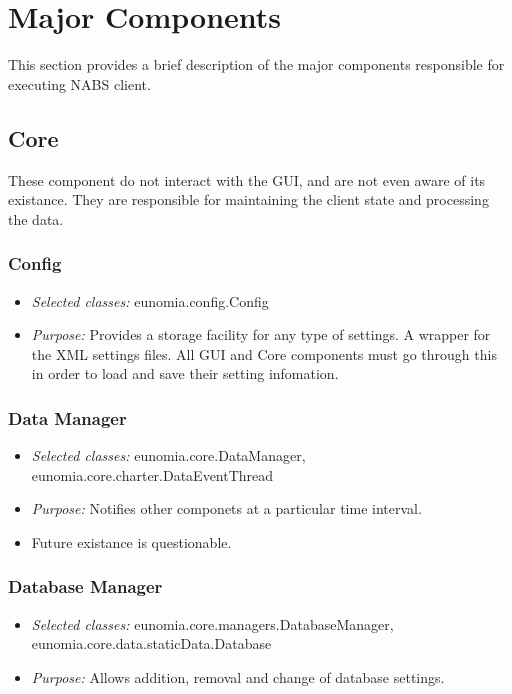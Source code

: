 \documentclass[titlepage,12pt]{article}
\begin{document}
\section{Major Components}
This section provides a brief description of the major components responsible for executing NABS client.

\subsection{Core}
These component do not interact with the GUI, and are not even aware of its existance. They are responsible for maintaining the client state and processing the data.

\subsubsection{Config}
\begin{itemize}
\item \emph{Selected classes:} eunomia.config.Config
\item \emph{Purpose:} Provides a storage facility for any type of settings. A wrapper for the XML settings files. All GUI and Core components must go through this in order to load and save their setting infomation.
\end{itemize}

\subsubsection{Data Manager}
\begin{itemize}
\item \emph{Selected classes:} eunomia.core.DataManager, eunomia.core.charter.DataEventThread
\item \emph{Purpose:} Notifies other componets at a particular time interval.
\item Future existance is questionable.
\end{itemize}

\subsubsection{Database Manager}
\begin{itemize}
\item \emph{Selected classes:} eunomia.core.managers.DatabaseManager, eunomia.core.data.staticData.Database
\item \emph{Purpose:} Allows addition, removal and change of database settings.
\end{itemize}
\end{document}

